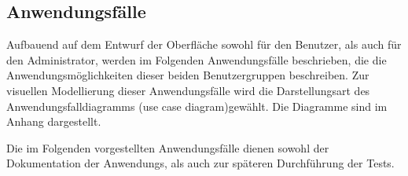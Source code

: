 \subsection{Anwendungsfälle}
\label{sec:Anwendungsfaelle}


Aufbauend auf dem Entwurf der Oberfläche sowohl für den Benutzer, als auch für den Administrator, werden im Folgenden Anwendungsfälle beschrieben, die die Anwendungsmöglichkeiten dieser beiden Benutzergruppen beschreiben. Zur visuellen Modellierung dieser Anwendungsfälle wird die Darstellungsart des Anwendungsfalldiagramms (use case diagram)\footnotemark gewählt. Die Diagramme sind im Anhang dargestellt.


Die im Folgenden vorgestellten Anwendungsfälle dienen sowohl der Dokumentation der Anwendungs, als auch zur späteren Durchführung der Tests.
